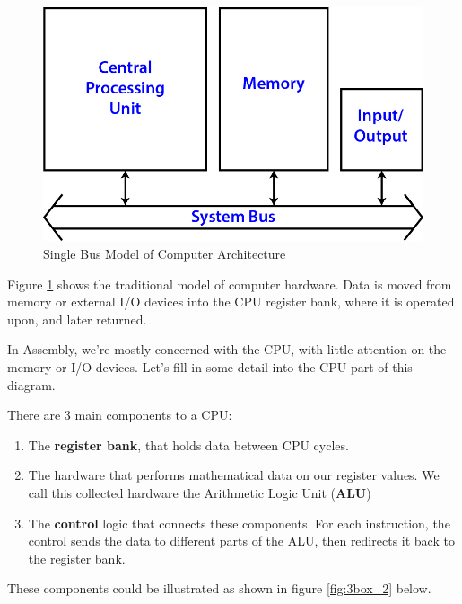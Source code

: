 \documentclass[a4paper, twocolumn, twoside, 11pt]{article}
\begin{document}
			\begin{figure}[h]
				\centering
				\includegraphics[width=1\linewidth]{img/3box_1}
				\caption[3 Box Model]{Single Bus Model of Computer Architecture}
				\label{fig:3box_1}
			\end{figure}
			
			Figure \ref{fig:3box_1} shows the traditional model of computer hardware. Data is moved from memory or external I/O devices into the CPU register bank, where it is operated upon, and later returned.
			
			In Assembly, we're mostly concerned with the CPU, with little attention on the memory or I/O devices. Let's fill in some detail into the CPU part of this diagram.
			
			\newpage
			There are 3 main components to a CPU:
			\begin{enumerate}
				\item The \textbf{register bank}, that holds data between CPU cycles.
				\item The hardware that performs mathematical data on our register values. We call this collected hardware the Arithmetic Logic Unit (\textbf{ALU})
				\item The \textbf{control} logic that connects these components. For each instruction, the control sends the data to different parts of the ALU, then redirects it back to the register bank.
			\end{enumerate}
			
			These components could be illustrated as shown in figure \ref{fig:3box_2} below.
			
\end{document}
